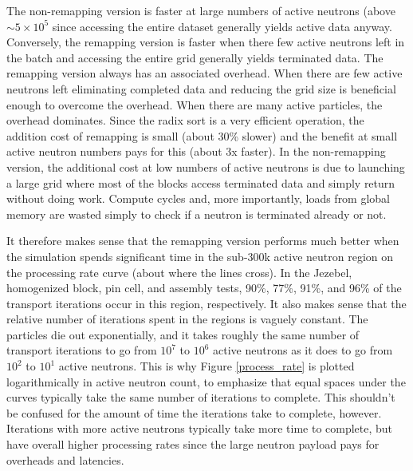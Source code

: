 The non-remapping version is faster at large numbers of active neutrons (above $\sim5 \times 10^{5}$ since accessing the entire dataset generally yields active data anyway.  Conversely, the remapping version is faster when there few active neutrons left in the batch and accessing the entire grid generally yields terminated data.  The remapping version always has an associated overhead. When there are few active neutrons left eliminating completed data and reducing the grid size is beneficial enough to overcome the overhead. When there are many active particles, the overhead dominates. %
  Since the radix sort is a very efficient operation, the addition cost of remapping is small (about 30\% slower) and the benefit at small active neutron numbers pays for this (about 3x faster).   In the non-remapping version, the additional cost at low numbers of active neutrons is due to launching a large grid where most of the blocks access terminated data and simply return without doing work.  Compute cycles and, more importantly, loads from global memory are wasted simply to check if a neutron is terminated already or not.

It therefore makes sense that the remapping version performs much better when the simulation spends significant time in the sub-300k active neutron region on the processing rate curve (about where the lines cross).  In the Jezebel, homogenized block, pin cell, and assembly tests, 90\%, 77\%, 91\%, and 96\% of the transport iterations occur in this region, respectively.%
 It also makes sense that the relative number of iterations spent in the regions is vaguely constant. %
  The particles die out exponentially, and it takes roughly the same number of transport iterations to go from $10^7$ to $10^6$ active neutrons as it does to go from $10^2$ to $10^1$ active neutrons. %
  This is why Figure \ref{process_rate} is plotted logarithmically in active neutron count, to emphasize that equal spaces under the curves typically take the same number of iterations to complete.  This shouldn't be confused for the amount of time the iterations take to complete, however.  Iterations with more active neutrons typically take more time to complete, but have overall higher processing rates since the large neutron payload pays for overheads and latencies.%

